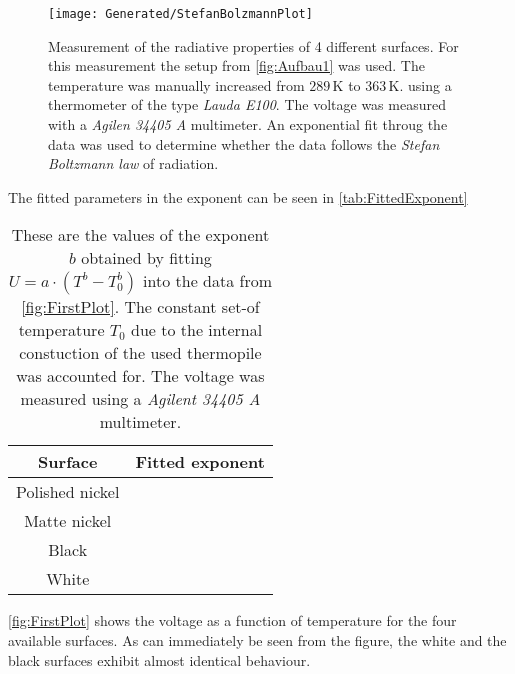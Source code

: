 \documentclass[a4paper,10pt,twocolumn]{article}
\begin{document}
    \begin{figure}
               \begin{center}
               \texttt{[image: Generated/StefanBolzmannPlot]}
               \caption{Measurement of the radiative properties of 4 different surfaces.
               For this measurement the setup from \autoref{fig:Aufbau1} was used. The temperature was manually increased from $ 289\,$K to $363\,$K. using a thermometer of the type \textit{Lauda E100}.
               The voltage was measured with a \textit{Agilen 34405 A} multimeter.
               An exponential fit throug the data was used to determine whether the data follows the \textit{Stefan Boltzmann law} of radiation.}
               \label{fig:FirstPlot}
               \end{center}
    \end{figure}
    The fitted parameters in the exponent can be seen in \autoref{tab:FittedExponent}
    \begin{table}[htbp]          %
        \centering
        \begin{tabular*}{0.9\linewidth}{@{\extracolsep{\fill}}cc}
            \hline
            \hline
            \rule[-7pt]{0pt}{23pt}  Surface  &  Fitted exponent 	 \\
            \hline
            \rule[-5pt]{0pt}{23pt}   Polished nickel   &   \ExponentPolished  	 \\
            \rule[-5pt]{0pt}{23pt}   Matte nickel   & \ExponentMatt     	 \\
            \rule[-5pt]{0pt}{23pt}   Black  &   \ExponentBlack  	 \\
            \rule[-5pt]{0pt}{23pt}   White   &   \ExponentWhite  	 \\
            \hline
            \hline
        \end{tabular*}
        \normalsize
        \caption[]{These are the values of the exponent $b$ obtained by fitting $U = a\cdot(T^b - T_0^b) $ into the data from \autoref{fig:FirstPlot}.
        The constant set-of temperature $T_0$ due to the internal constuction of the used thermopile was accounted for.
        The voltage was measured using a \textit{Agilent 34405 A} multimeter.}  %
        \label{tab:FittedExponent}                             %
    \end{table}
    \autoref{fig:FirstPlot} shows the voltage as a function of temperature for the four available surfaces.
    As can immediately be seen from the figure, the white and the black surfaces exhibit almost identical behaviour.
\end{document}
